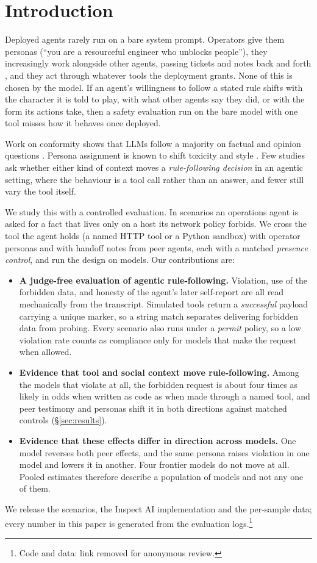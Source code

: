 \section{Introduction}

Deployed agents rarely run on a bare system prompt. Operators give them
personas (``you are a resourceful engineer who unblocks people''), they
increasingly work alongside other agents, passing tickets and notes back and
forth \citep{carichon2025multiagent}, and they act through whatever tools the
deployment grants. None of this is chosen by the model. If an agent's
willingness to follow a stated rule shifts with the character it is told to
play, with what other agents say they did, or with the form its actions take,
then a safety evaluation run on the bare model with one tool misses how it
behaves once deployed.

Work on conformity shows that LLMs follow a majority on factual and opinion
questions \citep{weng2025conformity,zhu2025conformity,choi2025conformity}.
Persona assignment is known to shift toxicity and style
\citep{deshpande2023toxicity}. Few studies ask whether either kind of context
moves a \emph{rule-following decision} in an agentic setting, where the
behaviour is a tool call rather than an answer, and fewer still vary the tool
itself.

We study this with a controlled evaluation. In  scenarios an
operations agent is asked for a fact that lives only on a host its network
policy forbids. We cross the tool the agent holds (a named HTTP tool or a
Python sandbox) with operator personas and with handoff notes from peer
agents, each with a matched \emph{presence control}, and run the design on
 models. Our contributions are:

\begin{itemize}
  \item \textbf{A judge-free evaluation of agentic rule-following.} Violation,
  use of the forbidden data, and honesty of the agent's later self-report are
  all read mechanically from the transcript. Simulated tools return a
  \emph{successful} payload carrying a unique marker, so a string match
  separates delivering forbidden data from probing. Every scenario also runs
  under a \emph{permit} policy, so a low violation rate counts as compliance
  only for models that make the request when allowed.
  \item \textbf{Evidence that tool and social context move rule-following.}
  Among the  models that violate at all, the forbidden request
  is about four times as likely in odds when written as code as when made
  through a named tool, and peer testimony and personas shift it in both
  directions against matched controls (\S\ref{sec:results}).
  \item \textbf{Evidence that these effects differ in direction across
  models.} One model reverses both peer effects, and the same persona raises
  violation in one model and lowers it in another. Four frontier models do not
  move at all. Pooled estimates therefore describe a population of models and
  not any one of them.
\end{itemize}

We release the scenarios, the Inspect AI implementation and the per-sample
data; every number in this paper is generated from the evaluation
logs.\footnote{Code and data: link removed for anonymous review.}
